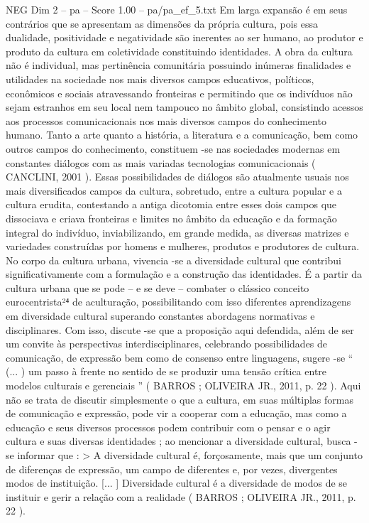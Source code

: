 \begin{textsample}{NEG Dim 2 – pa – Score 1.00 – pa/pa\_ef\_5.txt}
Em larga expansão é em seus contrários que se apresentam as dimensões da própria cultura, pois essa dualidade, positividade e negatividade são inerentes ao ser humano, ao produtor e produto da cultura em coletividade constituindo identidades.
A obra da cultura não é individual, mas pertinência comunitária possuindo inúmeras finalidades e utilidades na sociedade nos mais diversos campos educativos, políticos, econômicos e sociais atravessando fronteiras e permitindo que os indivíduos não sejam estranhos em seu local nem tampouco no âmbito global, consistindo acessos aos processos comunicacionais nos mais diversos campos do conhecimento humano.
Tanto a arte quanto a história, a literatura e a comunicação, bem como outros campos do conhecimento, constituem -se nas sociedades modernas em constantes diálogos com as mais variadas tecnologias comunicacionais ( CANCLINI, 2001 ).
Essas possibilidades de diálogos são atualmente usuais nos mais diversificados campos da cultura, sobretudo, entre a cultura popular e a cultura erudita, contestando a antiga dicotomia entre esses dois campos que dissociava e criava fronteiras e limites no âmbito da educação e da formação integral do indivíduo, inviabilizando, em grande medida, as diversas matrizes e variedades construídas por homens e mulheres, produtos e produtores de cultura.
No corpo da cultura urbana, vivencia -se a diversidade cultural que contribui significativamente com a formulação e a construção das identidades.
É a partir da cultura urbana que se pode – e se deve – combater o clássico conceito eurocentrista²⁴ de aculturação, possibilitando com isso diferentes aprendizagens em diversidade cultural superando constantes abordagens normativas e disciplinares.
Com isso, discute -se que a proposição aqui defendida, além de ser um convite às perspectivas interdisciplinares, celebrando possibilidades de comunicação, de expressão bem como de consenso entre linguagens, sugere -se “ (... ) um passo à frente no sentido de se produzir uma tensão crítica entre modelos culturais e gerenciais ” ( BARROS ; OLIVEIRA JR., 2011, p. 22 ).
Aqui não se trata de discutir simplesmente o que a cultura, em suas múltiplas formas de comunicação e expressão, pode vir a cooperar com a educação, mas como a educação e seus diversos processos podem contribuir com o pensar e o agir cultura e suas diversas identidades ; ao mencionar a diversidade cultural, busca -se informar que : > A diversidade cultural é, forçosamente, mais que um conjunto de diferenças de expressão, um campo de diferentes e, por vezes, divergentes modos de instituição. [... ] Diversidade cultural é a diversidade de modos de se instituir e gerir a relação com a realidade ( BARROS ; OLIVEIRA JR., 2011, p. 22 ).

\end{textsample}
